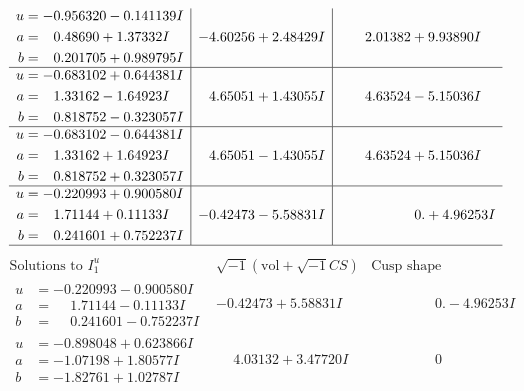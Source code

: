 \documentclass[1p]{elsarticle_modified}
\theoremstyle{definition}
\newcommand{\I}{\sqrt{-1}}
\begin{document}
$$\begin{array}{c|c|c}
\begin{aligned}
u &= -0.956320 - 0.141139 I \\
a &= \phantom{-}0.48690 + 1.37332 I \\
b &= \phantom{-}0.201705 + 0.989795 I\end{aligned}
 & -4.60256 + 2.48429 I & \phantom{-}2.01382 + 9.93890 I \\ \hline\begin{aligned}
u &= -0.683102 + 0.644381 I \\
a &= \phantom{-}1.33162 - 1.64923 I \\
b &= \phantom{-}0.818752 - 0.323057 I\end{aligned}
 & \phantom{-}4.65051 + 1.43055 I & \phantom{-}4.63524 - 5.15036 I \\ \hline\begin{aligned}
u &= -0.683102 - 0.644381 I \\
a &= \phantom{-}1.33162 + 1.64923 I \\
b &= \phantom{-}0.818752 + 0.323057 I\end{aligned}
 & \phantom{-}4.65051 - 1.43055 I & \phantom{-}4.63524 + 5.15036 I \\ \hline\begin{aligned}
u &= -0.220993 + 0.900580 I \\
a &= \phantom{-}1.71144 + 0.11133 I \\
b &= \phantom{-}0.241601 + 0.752237 I\end{aligned}
 & -0.42473 - 5.58831 I & \phantom{-0.000000 -}0. + 4.96253 I\\
 \hline 
 \end{array}$$\newpage$$\begin{array}{c|c|c}  
\text{Solutions to }I^u_{1}& \I (\text{vol} + \sqrt{-1}CS) & \text{Cusp shape}\\
 \hline 
\begin{aligned}
u &= -0.220993 - 0.900580 I \\
a &= \phantom{-}1.71144 - 0.11133 I \\
b &= \phantom{-}0.241601 - 0.752237 I\end{aligned}
 & -0.42473 + 5.58831 I & \phantom{-0.000000 } 0. - 4.96253 I \\ \hline\begin{aligned}
u &= -0.898048 + 0.623866 I \\
a &= -1.07198 + 1.80577 I \\
b &= -1.82761 + 1.02787 I\end{aligned}
 & \phantom{-}4.03132 + 3.47720 I & \phantom{-0.000000 } 0 \\ \hline\begin{aligned}

\end{aligned}
\end{array}$$
\end{document}
